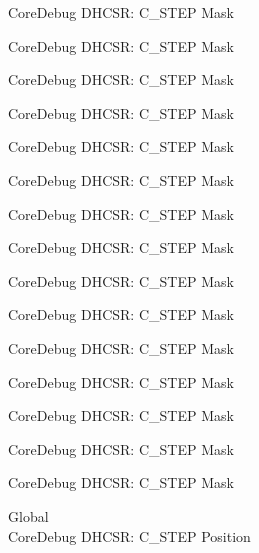\begin{DoxyRefList}
\label{deprecated__deprecated000124}%
%
Core\+Debug DHCSR\+: C\+\_\+\+STEP Mask 

\label{deprecated__deprecated000180}%
%
Core\+Debug DHCSR\+: C\+\_\+\+STEP Mask 

\label{deprecated__deprecated000263}%
%
Core\+Debug DHCSR\+: C\+\_\+\+STEP Mask 

\label{deprecated__deprecated000322}%
%
Core\+Debug DHCSR\+: C\+\_\+\+STEP Mask 

\label{deprecated__deprecated000398}%
%
Core\+Debug DHCSR\+: C\+\_\+\+STEP Mask 

\label{deprecated__deprecated000487}%
%
Core\+Debug DHCSR\+: C\+\_\+\+STEP Mask 

\label{deprecated__deprecated000589}%
%
Core\+Debug DHCSR\+: C\+\_\+\+STEP Mask 

\label{deprecated__deprecated000714}%
%
Core\+Debug DHCSR\+: C\+\_\+\+STEP Mask 

\label{deprecated__deprecated000802}%
%
Core\+Debug DHCSR\+: C\+\_\+\+STEP Mask 

\label{deprecated__deprecated000858}%
%
Core\+Debug DHCSR\+: C\+\_\+\+STEP Mask 

\label{deprecated__deprecated000941}%
%
Core\+Debug DHCSR\+: C\+\_\+\+STEP Mask 

\label{deprecated__deprecated001000}%
%
Core\+Debug DHCSR\+: C\+\_\+\+STEP Mask 

\label{deprecated__deprecated001076}%
%
Core\+Debug DHCSR\+: C\+\_\+\+STEP Mask 

\label{deprecated__deprecated001165}%
%
Core\+Debug DHCSR\+: C\+\_\+\+STEP Mask 

\label{deprecated__deprecated001267}%
%
Core\+Debug DHCSR\+: C\+\_\+\+STEP Mask  
\item[Global \doxylink{group___c_m_s_i_s___core_debug_gae1fc39e80de54c0339cbb1b298a9f0f9}{Core\+Debug\+\_\+\+DHCSR\+\_\+\+C\+\_\+\+STEP\+\_\+\+Pos} ]\hfill \\
\label{deprecated__deprecated000035}%
%
Core\+Debug DHCSR\+: C\+\_\+\+STEP Position 


\end{DoxyRefList}
